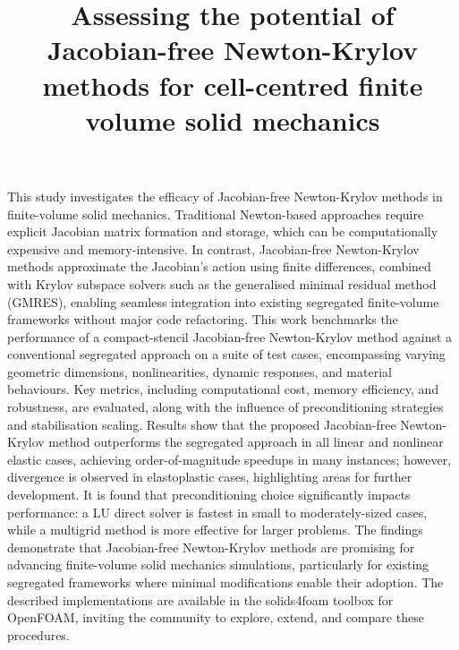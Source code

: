 \documentclass[sn-mathphys,Numbered]{sn-jnl}%
\begin{document}
\title[Article Title]{Assessing the potential of Jacobian-free Newton-Krylov methods for cell-centred finite volume solid mechanics}

\author*[1,2,3]{ }
\author[4]{ }
\author[4]{ }




\abstract
{
This study investigates the efficacy of Jacobian-free Newton-Krylov methods in finite-volume solid mechanics. Traditional Newton-based approaches require explicit Jacobian matrix formation and storage, which can be computationally expensive and memory-intensive.
In contrast, Jacobian-free Newton-Krylov methods approximate the Jacobian’s action using finite differences, combined with Krylov subspace solvers such as the generalised minimal residual method (GMRES), enabling seamless integration into existing segregated finite-volume frameworks without major code refactoring.
This work benchmarks the performance of a compact-stencil Jacobian-free Newton-Krylov method against a conventional segregated approach on a suite of test cases, encompassing varying geometric dimensions, nonlinearities, dynamic responses, and material behaviours.
Key metrics, including computational cost, memory efficiency, and robustness, are evaluated, along with the influence of preconditioning strategies and stabilisation scaling.
Results show that the proposed Jacobian-free Newton-Krylov method outperforms the segregated approach in all linear and nonlinear elastic cases, achieving order-of-magnitude speedups in many instances; however, divergence is observed in elastoplastic cases, highlighting areas for further development.
It is found that preconditioning choice significantly impacts performance: a LU direct solver is fastest in small to moderately-sized cases, while a multigrid method is more effective for larger problems.
The findings demonstrate that Jacobian-free Newton-Krylov methods are promising for advancing finite-volume solid mechanics simulations, particularly for existing segregated frameworks where minimal modifications enable their adoption.
The described implementations are available in the solids4foam toolbox for OpenFOAM, inviting the community to explore, extend, and compare these procedures.
}
\end{document}
